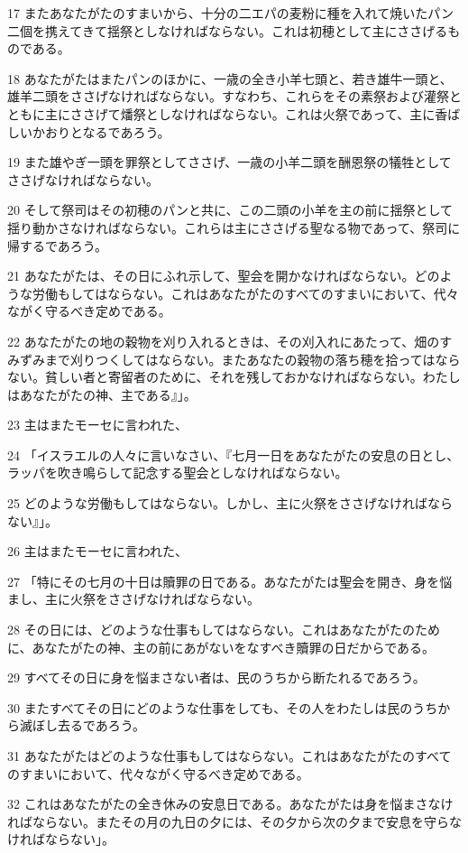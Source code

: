 \par 17 またあなたがたのすまいから、十分の二エパの麦粉に種を入れて焼いたパン二個を携えてきて揺祭としなければならない。これは初穂として主にささげるものである。
\par 18 あなたがたはまたパンのほかに、一歳の全き小羊七頭と、若き雄牛一頭と、雄羊二頭をささげなければならない。すなわち、これらをその素祭および灌祭とともに主にささげて燔祭としなければならない。これは火祭であって、主に香ばしいかおりとなるであろう。
\par 19 また雄やぎ一頭を罪祭としてささげ、一歳の小羊二頭を酬恩祭の犠牲としてささげなければならない。
\par 20 そして祭司はその初穂のパンと共に、この二頭の小羊を主の前に揺祭として揺り動かさなければならない。これらは主にささげる聖なる物であって、祭司に帰するであろう。
\par 21 あなたがたは、その日にふれ示して、聖会を開かなければならない。どのような労働もしてはならない。これはあなたがたのすべてのすまいにおいて、代々ながく守るべき定めである。
\par 22 あなたがたの地の穀物を刈り入れるときは、その刈入れにあたって、畑のすみずみまで刈りつくしてはならない。またあなたの穀物の落ち穂を拾ってはならない。貧しい者と寄留者のために、それを残しておかなければならない。わたしはあなたがたの神、主である』」。
\par 23 主はまたモーセに言われた、
\par 24 「イスラエルの人々に言いなさい、『七月一日をあなたがたの安息の日とし、ラッパを吹き鳴らして記念する聖会としなければならない。
\par 25 どのような労働もしてはならない。しかし、主に火祭をささげなければならない』」。
\par 26 主はまたモーセに言われた、
\par 27 「特にその七月の十日は贖罪の日である。あなたがたは聖会を開き、身を悩まし、主に火祭をささげなければならない。
\par 28 その日には、どのような仕事もしてはならない。これはあなたがたのために、あなたがたの神、主の前にあがないをなすべき贖罪の日だからである。
\par 29 すべてその日に身を悩まさない者は、民のうちから断たれるであろう。
\par 30 またすべてその日にどのような仕事をしても、その人をわたしは民のうちから滅ぼし去るであろう。
\par 31 あなたがたはどのような仕事もしてはならない。これはあなたがたのすべてのすまいにおいて、代々ながく守るべき定めである。
\par 32 これはあなたがたの全き休みの安息日である。あなたがたは身を悩まさなければならない。またその月の九日の夕には、その夕から次の夕まで安息を守らなければならない」。
